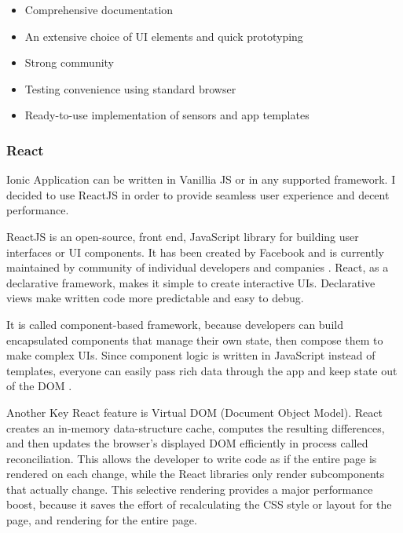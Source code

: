 \documentclass[../Main.tex]{subfiles}
\begin{document}
    \begin{itemize}
        \item Comprehensive documentation
        \item An extensive choice of UI elements and quick prototyping
        \item Strong community
        \item Testing convenience using standard browser
        \item Ready-to-use implementation of sensors and app templates
    \end{itemize}
    
    \subsubsection{React}
    Ionic Application can be written in Vanillia JS or in any supported framework. I decided to use ReactJS in order to provide seamless user experience and decent performance.
    
    ReactJS is an open-source, front end, JavaScript library for building user interfaces or UI components. It has been created by Facebook and is currently maintained by community of individual developers and companies \cite{reactjs}. React, as a declarative framework, makes it simple to create interactive UIs. Declarative views make written code more predictable and easy to debug.
    
    It is called component-based framework, because developers can build encapsulated components that manage their own state, then compose them to make complex UIs. Since component logic is written in JavaScript instead of templates, everyone can easily pass rich data through the app and keep state out of the DOM \cite{reactjs}. 
    
    Another Key React feature is Virtual DOM (Document Object Model). React creates an in-memory data-structure cache, computes the resulting differences, and then updates the browser's displayed DOM efficiently in process called reconciliation. This allows the developer to write code as if the entire page is rendered on each change, while the React libraries only render subcomponents that actually change. This selective rendering provides a major performance boost, because it saves the effort of recalculating the CSS style or layout for the page, and rendering for the entire page.
    
\newpage

\biblio %
\end{document}
